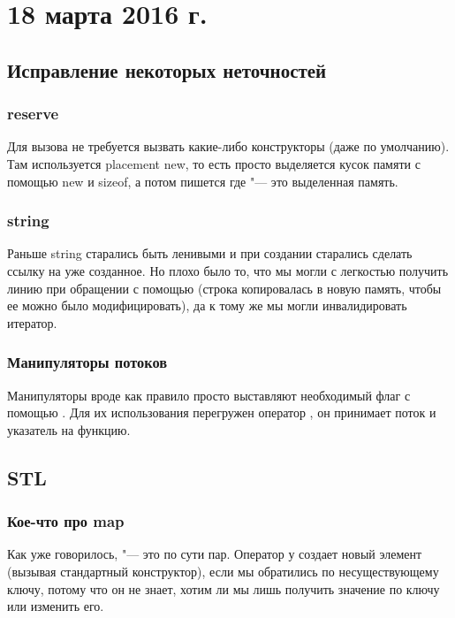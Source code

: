 \section{18 марта 2016 г.}

\subsection{Исправление некоторых неточностей}

\subsubsection{reserve}
Для вызова  не требуется вызвать какие-либо конструкторы (даже по умолчанию). Там используется placement new, то есть просто выделяется кусок памяти с помощью new и sizeof, а потом пишется  где  "--- это выделенная память.

\subsubsection{string}
Раньше string старались быть ленивыми и при создании старались сделать ссылку на уже созданное. Но плохо было то, что мы могли с легкостью получить линию при обращении с помощью \cc{[]} (строка копировалась в новую память, чтобы ее можно было модифицировать), да к тому же мы могли инвалидировать итератор.

\subsubsection{Манипуляторы потоков}
Манипуляторы вроде  как правило просто выставляют необходимый флаг с помощью . Для их использования перегружен оператор \cc{<<}, он принимает поток и указатель на функцию.

\subsection{STL}

\subsubsection{Кое-что про map}
Как уже говорилось,  "--- это по сути  пар. Оператор \cc{[]} у  создает новый элемент (вызывая стандартный конструктор), если мы обратились по несуществующему ключу, потому что он не знает, хотим ли мы лишь получить значение по ключу или изменить его.

